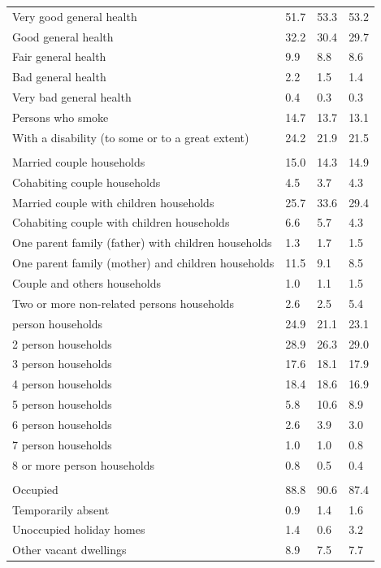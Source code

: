 \documentclass{article}
\begin{document}
\begin{table}[h]
\begin{tabular}{KTTT}
    \hline
Very good general health & 51.7& 53.3& 53.2\\
Good general health & 32.2& 30.4& 29.7\\
Fair general health & 9.9& 8.8& 8.6\\
Bad general health & 2.2& 1.5& 1.4\\
Very bad general health & 0.4& 0.3& 0.3\\
    \hline
Persons who smoke & 14.7& 13.7& 13.1\\
    \hline
With a disability (to some or to a great extent) & 24.2& 21.9& 21.5\\
\hline
    \\ 
    \hline
Married couple households & 15.0& 14.3& 14.9\\
Cohabiting couple households & 4.5& 3.7& 4.3\\
Married couple with children households & 25.7& 33.6& 29.4\\
Cohabiting couple with children households & 6.6& 5.7& 4.3\\
One parent family (father) with  children households & 1.3& 1.7& 1.5\\
One parent family (mother) and children households & 11.5&  9.1&  8.5\\
Couple and others households  & 1.0& 1.1& 1.5\\
Two or more non-related persons households & 2.6& 2.5& 5.4\\
     person households & 24.9& 21.1& 23.1\\
2 person households & 28.9& 26.3& 29.0\\
3 person households & 17.6& 18.1& 17.9\\
4 person households & 18.4& 18.6& 16.9\\
5 person households &  5.8& 10.6&  8.9\\
6 person households & 2.6& 3.9& 3.0\\
7 person households & 1.0& 1.0& 0.8\\
8 or more person households & 0.8& 0.5& 0.4\\
\hline
    \\ 
    \hline
Occupied & 88.8& 90.6& 87.4\\
Temporarily absent & 0.9& 1.4& 1.6\\
Unoccupied holiday homes & 1.4& 0.6& 3.2\\
Other vacant dwellings & 8.9& 7.5& 7.7\\
\hline
\end{tabular}
\end{table}
\end{document}
